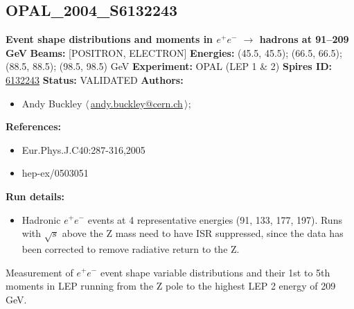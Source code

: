 \subsection[OPAL\_2004\_S6132243]{OPAL\_2004\_S6132243\,\cite{Abbiendi:2004qz}}
\textbf{Event shape distributions and moments in $e^+ e^-$ \ensuremath{\to} hadrons at 91--209 GeV}\newline
\textbf{Beams:} [POSITRON, ELECTRON] \newline
\textbf{Energies:} (45.5, 45.5); (66.5, 66.5); (88.5, 88.5); (98.5, 98.5) GeV \newline
\textbf{Experiment:} OPAL (LEP 1 \& 2) \newline
\textbf{Spires ID:} \href{http://www.slac.stanford.edu/spires/find/hep/www?rawcmd=key+6132243}{6132243}\newline
\textbf{Status:} VALIDATED\newline
\textbf{Authors:}
\begin{itemize}
  \item Andy Buckley $\langle\,$\href{mailto:andy.buckley@cern.ch}{andy.buckley@cern.ch}$\,\rangle$;
\end{itemize}
\textbf{References:}
\begin{itemize}
  \item Eur.Phys.J.C40:287-316,2005
  \item hep-ex/0503051
\end{itemize}
\textbf{Run details:}
\begin{itemize}

  \item Hadronic $e^+ e^-$ events at 4 representative energies (91, 133, 177, 197). Runs with \ensuremath{\sqrt{s}} above the Z mass need to have ISR suppressed, since the data has been corrected to remove radiative return to the Z.\end{itemize}

\noindent Measurement of $e^+ e^-$ event shape variable distributions and their 1st to 5th moments in LEP running from the Z pole to the highest LEP 2 energy of 209 GeV.

\clearpage


